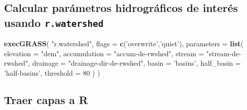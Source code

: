 \documentclass[11pt,]{article}
\newenvironment{Shaded}{\begin{snugshade}}{\end{snugshade}}
\newcommand{\KeywordTok}[1]{\textcolor[rgb]{0.13,0.29,0.53}{\textbf{#1}}}
\newcommand{\DataTypeTok}[1]{\textcolor[rgb]{0.13,0.29,0.53}{#1}}
\newcommand{\DecValTok}[1]{\textcolor[rgb]{0.00,0.00,0.81}{#1}}
\newcommand{\StringTok}[1]{\textcolor[rgb]{0.31,0.60,0.02}{#1}}
\newcommand{\NormalTok}[1]{#1}
\begin{document}
\subsection{\texorpdfstring{Calcular parámetros hidrográficos de interés
usando
\texttt{r.watershed}}{Calcular parámetros hidrográficos de interés usando r.watershed}}\label{calcular-paruxe1metros-hidrogruxe1ficos-de-interuxe9s-usando-r.watershed}

\begin{Shaded}
\begin{Highlighting}[]
\KeywordTok{execGRASS}\NormalTok{(}
  \StringTok{"r.watershed"}\NormalTok{,}
  \DataTypeTok{flags =} \KeywordTok{c}\NormalTok{(}\StringTok{'overwrite'}\NormalTok{,}\StringTok{'quiet'}\NormalTok{),}
  \DataTypeTok{parameters =} \KeywordTok{list}\NormalTok{(}
    \DataTypeTok{elevation =} \StringTok{"dem"}\NormalTok{,}
    \DataTypeTok{accumulation =} \StringTok{"accum-de-rwshed"}\NormalTok{,}
    \DataTypeTok{stream =} \StringTok{"stream-de-rwshed"}\NormalTok{,}
    \DataTypeTok{drainage =} \StringTok{"drainage-dir-de-rwshed"}\NormalTok{,}
    \DataTypeTok{basin =} \StringTok{'basins'}\NormalTok{,}
    \DataTypeTok{half_basin =} \StringTok{'half-basins'}\NormalTok{,}
    \DataTypeTok{threshold =} \DecValTok{80}
\NormalTok{  )}
\NormalTok{)}
\end{Highlighting}
\end{Shaded}

\subsection{Traer capas a R}\label{traer-capas-a-r}
\end{document}
